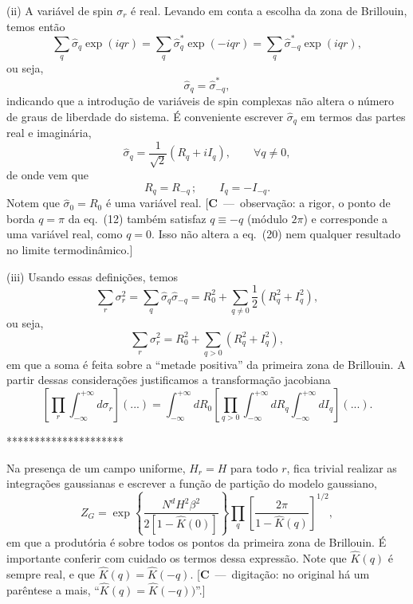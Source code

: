 \documentclass[12pt,a4paper]{article}
\newcommand{\sh}{\widehat{\sigma}}
\newcommand{\Kh}{\widehat{K}}
\newcounter{corr}
\newcommand{\nota}[2]{\refstepcounter{corr}\label{#1}%
  {\color{red}\small[\textbf{C\thecorr}~---~#2]}}
\begin{document}
(ii) A variável de spin $\sigma_r$ é real. Levando em conta a escolha da zona de
Brillouin, temos então
\begin{equation}
\sum_q\sh_q\exp\left(iqr\right)=\sum_q\sh_q^{*}\exp\left(-iqr\right)=\sum_q\sh_{-q}^{*}\exp\left(iqr\right),
\end{equation}
ou seja,
\begin{equation}
\sh_q=\sh_{-q}^{*},
\end{equation}
indicando que a introdução de variáveis de spin complexas não altera o
número de graus de liberdade do sistema. É conveniente escrever $\sh_q$ em
termos das partes real e imaginária,
\begin{equation}
\sh_q=\frac{1}{\sqrt2}\left(R_q+iI_q\right),\qquad\forall q\neq0,
\end{equation}
de onde vem que
\begin{equation}
R_q=R_{-q}\,;\qquad I_q=-I_{-q}.
\end{equation}
Notem que $\sh_0=R_0$ é uma variável real.
\nota{c:qpi}{observação: a rigor, o ponto de borda $q=\pi$ da eq.~(12)
também satisfaz $q\equiv-q$ (módulo $2\pi$) e corresponde a uma variável real, como $q=0$.
Isso não altera a eq.~(20) nem qualquer resultado no limite termodinâmico.}

(iii) Usando essas definições, temos
\begin{equation}
\sum_r\sigma_r^2=\sum_q\sh_q\sh_{-q}=R_0^2+\sum_{q\neq0}\frac12\left(R_q^2+I_q^2\right),
\end{equation}
ou seja,
\begin{equation}
\sum_r\sigma_r^2=R_0^2+\sum_{q>0}\left(R_q^2+I_q^2\right),
\end{equation}
em que a soma é feita sobre a ``metade positiva'' da primeira zona de Brillouin.
A partir dessas considerações justificamos a transformação jacobiana
\begin{equation}
\left[\prod_r\int_{-\infty}^{+\infty}d\sigma_r\right](...)=
\int_{-\infty}^{+\infty}dR_0\left[\prod_{q>0}\int_{-\infty}^{+\infty}dR_q\int_{-\infty}^{+\infty}dI_q\right](...).
\end{equation}

\begin{center}*********************\end{center}

Na presença de um campo uniforme, $H_r=H$ para todo $r$, fica trivial
realizar as integrações gaussianas e escrever a função de partição do modelo
gaussiano,
\begin{equation}
Z_G=\exp\left\{\frac{N^dH^2\beta^2}{2\left[1-\Kh(0)\right]}\right\}
\prod_q\left[\frac{2\pi}{1-\Kh(q)}\right]^{1/2},
\end{equation}
em que a produtória é sobre todos os pontos da primeira zona de Brillouin. É
importante conferir com cuidado os termos dessa expressão. Note que $\Kh(q)$
é sempre real, e que $\Kh(q)=\Kh(-q)$.
\nota{c:paren}{digitação: no original há um parêntese a mais, ``$\Kh(q)=\Kh(-q))$''.}
\end{document}
